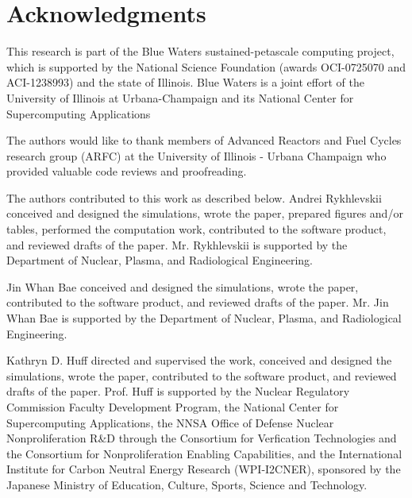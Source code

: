 \section{Acknowledgments}

This research is part of the Blue Waters sustained-petascale computing project, 
which is supported by the National Science Foundation (awards OCI-0725070 and 
ACI-1238993) and the state of Illinois. Blue Waters is a joint effort of the 
University of Illinois at Urbana-Champaign and its National Center for 
Supercomputing Applications 

The authors would like to thank  members of Advanced Reactors and Fuel Cycles
research group (ARFC) at the University of Illinois - Urbana Champaign who 
provided valuable code reviews and proofreading.

The authors contributed to this work as described below.  Andrei Rykhlevskii 
conceived and designed the simulations, wrote the paper, prepared figures 
and/or tables, performed the computation work, contributed to the software 
product, and reviewed drafts of the paper. Mr. Rykhlevskii is supported by the 
Department of Nuclear, Plasma, and Radiological Engineering. 

Jin Whan Bae conceived and designed the simulations, wrote the paper, contributed 
to the software 
product, and reviewed drafts of the paper. Mr. Jin Whan Bae is supported by the 
Department of Nuclear, Plasma, and Radiological Engineering.

Kathryn D. Huff directed and 
supervised the work, conceived and designed the simulations, wrote the paper, 
contributed to the software product, and reviewed drafts of the paper.  Prof. 
Huff is supported by the Nuclear Regulatory Commission Faculty Development 
Program, the National Center for Supercomputing Applications, the NNSA Office 
of Defense Nuclear Nonproliferation R\&D through the Consortium for Verfication 
Technologies and the Consortium for Nonproliferation Enabling Capabilities, and 
the International Institute for Carbon Neutral Energy Research (WPI-I2CNER), 
sponsored by the Japanese Ministry of Education, Culture, Sports, Science and 
Technology.
